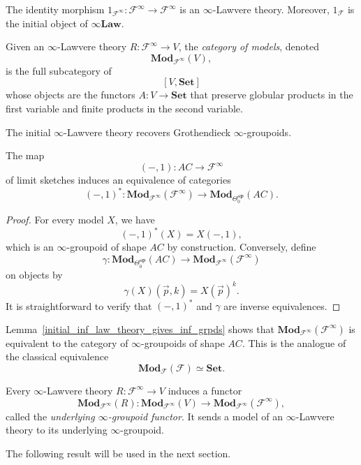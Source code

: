 \documentclass{tac}
\begin{document}
\begin{example}
The identity morphism $1_{\mathcal{F}^\infty}:\mathcal{F}^\infty\to\mathcal{F}^\infty$ is an $\infty$-Lawvere theory. Moreover, $1_{\mathcal{F}}$ is the initial object of $\infty\mathbf{Law}$.
\end{example}

\begin{definition}
Given an $\infty$-Lawvere theory $R:\mathcal{F}^\infty\to V$, the \emph{category of models}, denoted
\[
\mathbf{Mod}_{\mathcal{F}^\infty}(V),
\]
is the full subcategory of
\[
[V,\mathbf{Set}]
\]
whose objects are the functors $A:V\to\mathbf{Set}$ that preserve globular products in the first variable and finite products in the second variable.
\end{definition}

The initial $\infty$-Lawvere theory recovers Grothendieck $\infty$-groupoids.

\begin{lemma}\label{initial_inf_law_theory_gives_inf_grpds}
The map
\[
(-,1):AC\to\mathcal{F}^\infty
\]
of limit sketches induces an equivalence of categories
\[
(-,1)^*:\mathbf{Mod}_{\mathcal{F}^\infty}(\mathcal{F}^\infty)\to\mathbf{Mod}_{\Theta_0^\mathbf{op}}(AC).
\]
\end{lemma}

\begin{proof}
For every model $X$, we have
\[
(-,1)^*(X)=X(-,1),
\]
which is an $\infty$-groupoid of shape $AC$ by construction. Conversely, define
\[
\gamma:\mathbf{Mod}_{\Theta_0^\mathbf{op}}(AC)\to\mathbf{Mod}_{\mathcal{F}^\infty}(\mathcal{F}^\infty)
\]
on objects by
\[
\gamma(X)(\vec{p},k)=X(\vec{p})^k.
\]
It is straightforward to verify that $(-,1)^*$ and $\gamma$ are inverse equivalences.
\end{proof}

Lemma~\ref{initial_inf_law_theory_gives_inf_grpds} shows that $\mathbf{Mod}_{\mathcal{F}^\infty}(\mathcal{F}^\infty)$ is equivalent to the category of $\infty$-groupoids of shape $AC$. This is the analogue of the classical equivalence
\[
\mathbf{Mod}_{\mathcal{F}}(\mathcal{F})\simeq\mathbf{Set}.
\]

\begin{definition}
Every $\infty$-Lawvere theory $R:\mathcal{F}^\infty\to V$ induces a functor
\[
\mathbf{Mod}_{\mathcal{F}^\infty}(R): \mathbf{Mod}_{\mathcal{F}^\infty}(V)\to \mathbf{Mod}_{\mathcal{F}^\infty}(\mathcal{F}^\infty),
\]
called the \emph{underlying $\infty$-groupoid functor}. It sends a model of an $\infty$-Lawvere theory to its underlying $\infty$-groupoid.
\end{definition}
The following result will be used in the next section.
\end{document}
